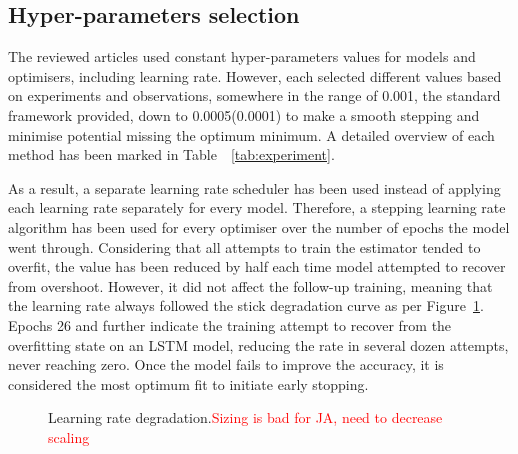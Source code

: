 \subsection{Hyper-parameters selection} \label{subsec:l-rate}
%
The reviewed articles used constant hyper-parameters values for models and optimisers, including learning rate.
However, each selected different values based on experiments and observations, somewhere in the range of 0.001, the standard framework provided, down to 0.0005(0.0001) to make a smooth stepping and minimise potential missing the optimum minimum.
A detailed overview of each method has been marked in \mbox{Table ~\ref{tab:experiment}}.

%
As a result, a separate learning rate scheduler has been used instead of applying each learning rate separately for every model.
Therefore, a stepping learning rate algorithm has been used for every optimiser over the number of epochs the model went through.
Considering that all attempts to train the estimator tended to overfit, the value has been reduced by half each time model attempted to recover from overshoot.
However, it did not affect the follow-up training, meaning that the learning rate always followed the stick degradation curve as per Figure~\ref{fig:l_rate_progress}.
Epochs 26 and further indicate the training attempt to recover from the overfitting state on an LSTM model, reducing the rate in several dozen attempts, never reaching zero.
Once the model fails to improve the accuracy, it is considered the most optimum fit to initiate early stopping.
\begin{figure}[ht]
    \centering
    
    \caption{Learning rate degradation.\textcolor{red}{Sizing is bad for JA, need to decrease scaling}}
    \label{fig:l_rate_progress}
\end{figure}

